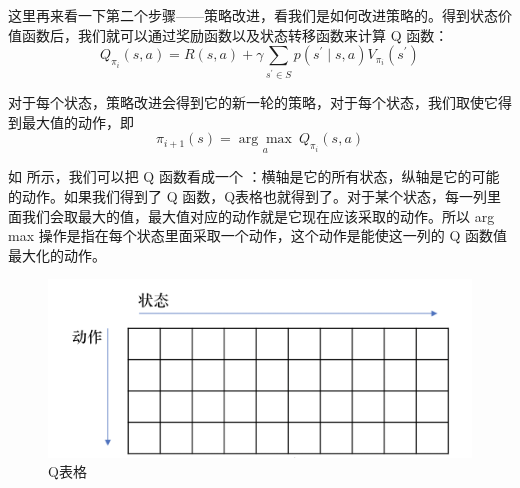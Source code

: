 这里再来看一下第二个步骤------策略改进，看我们是如何改进策略的。得到状态价值函数后，我们就可以通过奖励函数以及状态转移函数来计算 Q 函数：
\begin{equation}
  Q_{\pi_{i}}(s, a)=R(s, a)+\gamma \sum_{s^{\prime} \in S} p\left(s^{\prime} \mid s, a\right) V_{\pi_{i}}\left(s^{\prime}\right)
  \label{eq:}
\end{equation}

对于每个状态，策略改进会得到它的新一轮的策略，对于每个状态，我们取使它得到最大值的动作，即
\begin{equation}
  \pi_{i+1}(s)=\underset{a}{\arg \max } ~Q_{\pi_{i}}(s, a)
  \label{eq:}
\end{equation}

如 所示，我们可以把 Q 函数看成一个 ：横轴是它的所有状态，纵轴是它的可能的动作。如果我们得到了 Q 函数，Q表格也就得到了。对于某个状态，每一列里面我们会取最大的值，最大值对应的动作就是它现在应该采取的动作。所以 arg max 操作是指在每个状态里面采取一个动作，这个动作是能使这一列的 Q 函数值最大化的动作。

\begin{figure}[hbt]
  \centering
  \includegraphics[width=0.4\linewidth]{res/ch2/2.46}
  \caption{Q表格}
  \label{fig:q_table}
\end{figure}



  
    
  


